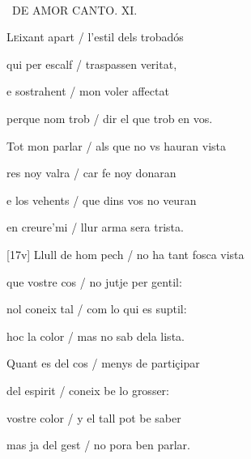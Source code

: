 \documentclass[12pt]{article}
\renewcommand{\espaiAbansEtiquetaPoema}{\vspace{0ex}}
\begin{document}
\begin{estrofa}

\espaiAbansEtiquetaPoema

\\

\begin{rubrica}

\textparagraph\  DE AMOR CANTO. XI.

\end{rubrica}

\end{estrofa}


\begin{estrofa}

 L\textsc{e}ixant apart / l'estil dels trobad\'{o}s

 qui per escalf / traspassen veritat,

 e sostrahent / mon voler affectat

 perque nom trob / dir el que trob en vos.

 Tot  mon parlar / als que no vs hauran vista

 res noy valra / car fe noy donaran

 e los vehents / que dins vos no veuran

 en creure'mi / llur arma sera trista.

\end{estrofa}



\begin{estrofa}

 [17v] Llull de hom pech / no ha tant fosca vista

 que vostre cos / no jutje per gentil:

 nol coneix tal / com lo qui es suptil:

 hoc la color / mas no sab dela lista.

 Quant es del cos / menys de parti\c{c}ipar

 del espirit / coneix be lo grosser:

 vostre color / y el tall pot be saber

 mas ja del gest / no pora ben parlar.

\end{estrofa}
\end{document}
